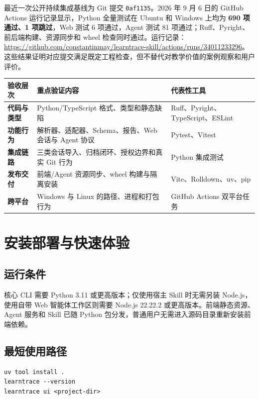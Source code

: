 \documentclass[UTF8,a4paper,12pt]{ctexart}
\begin{document}
最近一次公开持续集成基线为 Git 提交 \texttt{0af1135}。2026 年 9 月 6 日的 GitHub Actions 运行记录显示，Python 全量测试在 Ubuntu 和 Windows 上均为 \textbf{690 项通过、1 项跳过}，Web 测试 6 项通过，Agent 测试 81 项通过；Ruff、Pyright、前后端构建、资源同步和 wheel 检查同时通过。运行记录：\url{https://github.com/constantinmay/learntrace-skill/actions/runs/34011233296}。这些结果证明对应提交满足既定工程检查，但不替代对教学价值的案例观察和用户评价。

\begin{center}
\small
\begin{tabularx}{\textwidth}{>{\bfseries}p{}X X}
\toprule
验收层次 & 重点验证内容 & 代表性工具 \\
\midrule
代码与类型 & Python/TypeScript 格式、类型和静态缺陷 & Ruff、Pyright、TypeScript、ESLint \\
功能行为 & 解析器、适配器、Schema、报告、Web 会话与 Agent 协议 & Pytest、Vitest \\
集成链路 & 三类会话导入、归档闭环、授权边界和真实 Git 行为 & Python 集成测试 \\
发布交付 & 前端/Agent 资源同步、wheel 构建与隔离安装 & Vite、Rolldown、uv、pip \\
跨平台 & Windows 与 Linux 的路径、进程和打包行为 & GitHub Actions 双平台任务 \\
\bottomrule
\end{tabularx}
\end{center}

\section{安装部署与快速体验}

\subsection{运行条件}

核心 CLI 需要 Python 3.11 或更高版本；仅使用宿主 Skill 时无需另装 Node.js，使用自带 Web 智能体工作区则需要 Node.js 22.22.2 或更高版本。前端静态资源、Agent 服务和 Skill 已随 Python 包分发，普通用户无需进入源码目录重新安装前端依赖。

\subsection{最短使用路径}

\begin{lstlisting}
uv tool install .
learntrace --version
learntrace ui <project-dir>
\end{lstlisting}
\end{document}
